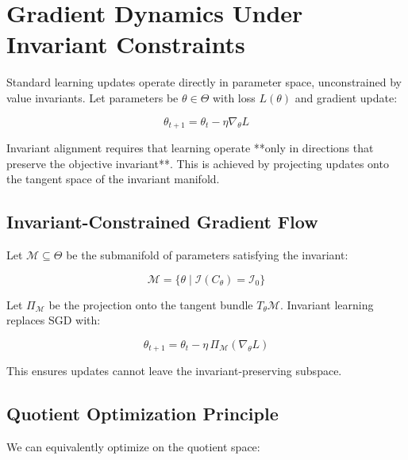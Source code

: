 \documentclass[11pt,a4paper]{article}
\theoremstyle{plain}
\theoremstyle{definition}
\theoremstyle{remark}
\numberwithin{equation}{section}
\begin{document}
\section{Gradient Dynamics Under Invariant Constraints}

Standard learning updates operate directly in parameter space, unconstrained by value invariants.  
Let parameters be $\theta \in \Theta$ with loss $L(\theta)$ and gradient update:

\[
\theta_{t+1} = \theta_t - \eta \nabla_\theta L
\]

Invariant alignment requires that learning operate **only in directions that preserve the objective invariant**.  
This is achieved by projecting updates onto the tangent space of the invariant manifold.

\subsection{Invariant-Constrained Gradient Flow}

Let $\mathcal{M} \subseteq \Theta$ be the submanifold of parameters satisfying the invariant:

\[
\mathcal{M} = \{ \theta \mid \mathcal{I}(C_\theta) = \mathcal{I}_0 \}
\]

Let $\Pi_{\mathcal{M}}$ be the projection onto the tangent bundle $T_\theta \mathcal{M}$.  
Invariant learning replaces SGD with:

\[
\boxed{\theta_{t+1} = \theta_t - \eta \, \Pi_{\mathcal{M}} (\nabla_\theta L)}
\]

This ensures updates cannot leave the invariant-preserving subspace.

\subsection{Quotient Optimization Principle}

We can equivalently optimize on the quotient space:
\end{document}
